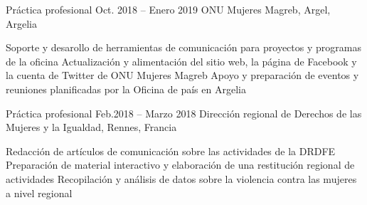 \begin{joblist}

\item[Práctica profesional]{Oct. 2018 -- Enero 2019 }     
	{ONU Mujeres Magreb, Argel, Argelia}     
	{
			 
		\vspace{-0.5cm}
		\begin{itemize}
			  \iftbftiny \setlength\itemsep{-3pt} \fi
			  \cvitem[\checkmark] Soporte y desarollo de herramientas de comunicación para proyectos y programas de la oficina      
 			  \cvitem[\checkmark] Actualización y alimentación del sitio web, la página de Facebook y la cuenta de Twitter de ONU Mujeres Magreb                                                          
			  \cvitem[\checkmark] Apoyo y preparación de eventos y reuniones planificadas por la Oficina de país en Argelia
		\end{itemize}      

	}


\item[Práctica profesional]{Feb.2018 -- Marzo 2018 }     
	{Dirección regional de Derechos de las Mujeres y la Igualdad, Rennes, Francia}     
	{
			 
		\iftbftiny \vspace{-0.5cm} \fi
		\begin{itemize}
			  \iftbftiny \setlength\itemsep{-3pt} \fi
			  \cvitem[\checkmark] Redacción de artículos de comunicación sobre las actividades de la DRDFE  
			  \cvitem[\checkmark] Preparación de material interactivo y elaboración de una restitución regional de actividades
			  \cvitem[\checkmark] Recopilación y análisis de datos sobre la violencia contra las mujeres a nivel regional
		\end{itemize}      

}
\end{joblist}
